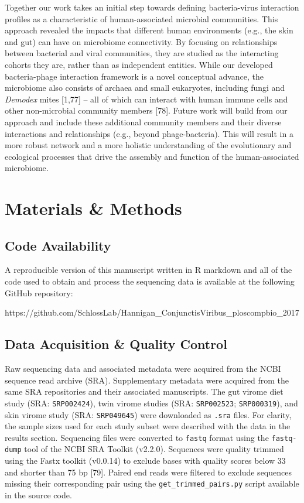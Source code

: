 \documentclass[12pt,]{article}
\begin{document}
Together our work takes an initial step towards defining bacteria-virus
interaction profiles as a characteristic of human-associated microbial
communities. This approach revealed the impacts that different human
environments (e.g., the skin and gut) can have on microbiome
connectivity. By focusing on relationships between bacterial and viral
communities, they are studied as the interacting cohorts they are,
rather than as independent entities. While our developed bacteria-phage
interaction framework is a novel conceptual advance, the microbiome also
consists of archaea and small eukaryotes, including fungi and
\emph{Demodex} mites {[}1,77{]} -- all of which can interact with human
immune cells and other non-microbial community members {[}78{]}. Future
work will build from our approach and include these additional community
members and their diverse interactions and relationships (e.g., beyond
phage-bacteria). This will result in a more robust network and a more
holistic understanding of the evolutionary and ecological processes that
drive the assembly and function of the human-associated microbiome.

\section{Materials \& Methods}\label{materials-methods}

\subsection{Code Availability}\label{code-availability}

A reproducible version of this manuscript written in R markdown and all
of the code used to obtain and process the sequencing data is available
at the following GitHub repository:

https://github.com/SchlossLab/Hannigan\_ConjunctisViribus\_ploscompbio\_2017

\subsection{Data Acquisition \& Quality
Control}\label{data-acquisition-quality-control}

Raw sequencing data and associated metadata were acquired from the NCBI
sequence read archive (SRA). Supplementary metadata were acquired from
the same SRA repositories and their associated manuscripts. The gut
virome diet study (SRA: \texttt{SRP002424}), twin virome studies (SRA:
\texttt{SRP002523}; \texttt{SRP000319}), and skin virome study (SRA:
\texttt{SRP049645}) were downloaded as \texttt{.sra} files. For clarity,
the sample sizes used for each study subset were described with the data
in the results section. Sequencing files were converted to
\texttt{fastq} format using the \texttt{fastq-dump} tool of the NCBI SRA
Toolkit (v2.2.0). Sequences were quality trimmed using the Fastx toolkit
(v0.0.14) to exclude bases with quality scores below 33 and shorter than
75 bp {[}79{]}. Paired end reads were filtered to exclude sequences
missing their corresponding pair using the
\texttt{get\_trimmed\_pairs.py} script available in the source code.
\end{document}

